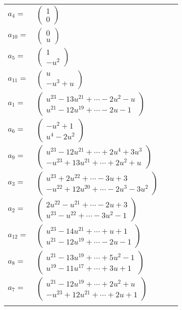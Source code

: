 \documentclass[1p]{elsarticle_modified}
\theoremstyle{definition}
\begin{document}
\begin{tabular}{m{7pt} m{180pt} m{7pt} m{180pt} }
\flushright $a_{4}=$&$\begin{pmatrix}1\\0\end{pmatrix}$ \\
\flushright $a_{10}=$&$\begin{pmatrix}0\\u\end{pmatrix}$ \\
\flushright $a_{5}=$&$\begin{pmatrix}1\\- u^2\end{pmatrix}$ \\
\flushright $a_{11}=$&$\begin{pmatrix}u\\- u^3+u\end{pmatrix}$ \\
\flushright $a_{1}=$&$\begin{pmatrix}u^{23}-13 u^{21}+\cdots-2 u^2- u\\u^{21}-12 u^{19}+\cdots-2 u-1\end{pmatrix}$ \\
\flushright $a_{6}=$&$\begin{pmatrix}- u^2+1\\u^4-2 u^2\end{pmatrix}$ \\
\flushright $a_{9}=$&$\begin{pmatrix}u^{23}-12 u^{21}+\cdots+2 u^4+3 u^3\\- u^{23}+13 u^{21}+\cdots+2 u^2+u\end{pmatrix}$ \\
\flushright $a_{3}=$&$\begin{pmatrix}u^{23}+2 u^{22}+\cdots-3 u+3\\- u^{22}+12 u^{20}+\cdots-2 u^3-3 u^2\end{pmatrix}$ \\
\flushright $a_{2}=$&$\begin{pmatrix}2 u^{22}- u^{21}+\cdots-2 u+3\\u^{23}- u^{22}+\cdots-3 u^2-1\end{pmatrix}$ \\
\flushright $a_{12}=$&$\begin{pmatrix}u^{23}-14 u^{21}+\cdots+u+1\\u^{21}-12 u^{19}+\cdots-2 u-1\end{pmatrix}$ \\
\flushright $a_{8}=$&$\begin{pmatrix}u^{21}-13 u^{19}+\cdots+5 u^2-1\\u^{19}-11 u^{17}+\cdots+3 u+1\end{pmatrix}$ \\
\flushright $a_{7}=$&$\begin{pmatrix}u^{21}-12 u^{19}+\cdots+2 u^2+u\\- u^{23}+12 u^{21}+\cdots+2 u+1\end{pmatrix}$\\&\end{tabular}
\end{document}
